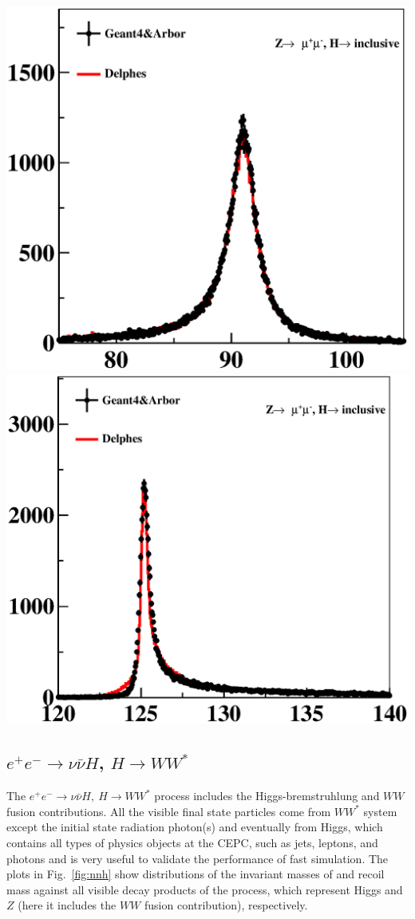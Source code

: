 \documentclass[a4paper,10pt,twoside]{cpc-hepnp}
\begin{document}
\begin{center}
\includegraphics[width=0.4\linewidth]{figs/e2e2h_mass}
\includegraphics[width=0.4\linewidth]{figs/e2e2h_reco}
\end{center}

\subsection{$e^+e^-\to \nu\bar{\nu}H$, $H \to WW^*$}

The $e^+e^- \to \nu\bar{\nu}H,~H\to WW^*$ process includes the Higgs-bremstruhlung and $WW$ fusion  contributions.
All the visible final state particles come from $WW^*$ system except the initial state radiation photon(s) and eventually from Higgs,
which contains all types of physics objects at the CEPC, such as jets, leptons, and photons
and is very useful to validate the performance of fast simulation.
The plots in Fig.~\ref{fig:nnh} show distributions of the invariant masses of and recoil mass against all visible decay products of the process,
which represent Higgs and $Z$ (here it includes the $WW$ fusion contribution), respectively.
\end{document}
